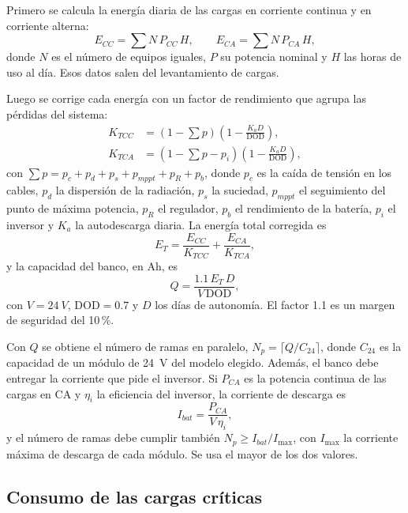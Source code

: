 Primero se calcula la energía diaria de las cargas en corriente continua y en corriente alterna:
\begin{equation}
E_{CC} = \sum N\,P_{CC}\,H, \qquad E_{CA} = \sum N\,P_{CA}\,H,
\end{equation}
donde $N$ es el número de equipos iguales, $P$ su potencia nominal y $H$ las horas de uso al día. Esos datos salen del levantamiento de cargas.

Luego se corrige cada energía con un factor de rendimiento que agrupa las pérdidas del sistema:
\begin{align}
K_{TCC} &= \left(1-\textstyle\sum p\right)\left(1-\frac{K_a D}{\mathrm{DOD}}\right),\\
K_{TCA} &= \left(1-\textstyle\sum p - p_i\right)\left(1-\frac{K_a D}{\mathrm{DOD}}\right),
\end{align}
con $\sum p = p_c+p_d+p_s+p_{mppt}+p_R+p_b$, donde $p_c$ es la caída de tensión en los cables, $p_d$ la dispersión de la radiación, $p_s$ la suciedad, $p_{mppt}$ el seguimiento del punto de máxima potencia, $p_R$ el regulador, $p_b$ el rendimiento de la batería, $p_i$ el inversor y $K_a$ la autodescarga diaria. La energía total corregida es
\begin{equation}
E_T = \frac{E_{CC}}{K_{TCC}} + \frac{E_{CA}}{K_{TCA}},
\end{equation}
y la capacidad del banco, en Ah, es
\begin{equation}
Q = \frac{1.1\,E_T\,D}{V\,\mathrm{DOD}},
\label{eq:capacidad}
\end{equation}
con $V = \SI{24}{V}$, $\mathrm{DOD} = 0.7$ y $D$ los días de autonomía. El factor 1.1 es un margen de seguridad del 10\,\%.

Con $Q$ se obtiene el número de ramas en paralelo, $N_p = \lceil Q / C_{24} \rceil$, donde $C_{24}$ es la capacidad de un módulo de \SI{24}{V} del modelo elegido. Además, el banco debe entregar la corriente que pide el inversor. Si $P_{CA}$ es la potencia continua de las cargas en CA y $\eta_i$ la eficiencia del inversor, la corriente de descarga es
\begin{equation}
I_{bat} = \frac{P_{CA}}{V\,\eta_i},
\end{equation}
y el número de ramas debe cumplir también $N_p \geq I_{bat}/I_{\max}$, con $I_{\max}$ la corriente máxima de descarga de cada módulo. Se usa el mayor de los dos valores.

\subsection{Consumo de las cargas críticas}

